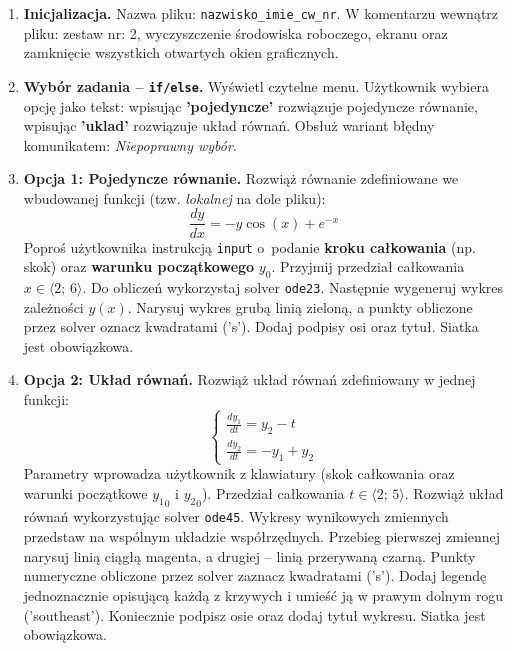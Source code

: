 \documentclass[a4paper,11pt]{article}
\begin{document}
\begin{enumerate}[leftmargin=*, label=\textbf{\arabic*.}, itemsep=2pt]

  \item \textbf{Inicjalizacja.}
    Nazwa pliku: \texttt{nazwisko\_imie\_cw\_nr}. W komentarzu wewnątrz pliku: zestaw nr: 2, wyczyszczenie środowiska roboczego, ekranu oraz zamknięcie wszystkich otwartych okien graficznych.

  \item \textbf{Wybór zadania -- \texttt{if/else}.}
    Wyświetl czytelne menu. Użytkownik wybiera opcję jako tekst: wpisując \textbf{'pojedyncze'} rozwiązuje pojedyncze równanie, wpisując \textbf{'uklad'} rozwiązuje układ równań. Obsłuż wariant błędny komunikatem: \textit{Niepoprawny wybór}.

  \item \textbf{Opcja 1: Pojedyncze równanie.}
    Rozwiąż równanie zdefiniowane we wbudowanej funkcji (tzw. \textit{lokalnej} na dole pliku):
    \[ \frac{dy}{dx} = -y\cos(x) + e^{-x} \]
    Poproś użytkownika instrukcją \texttt{input} o~podanie \textbf{kroku całkowania} (np. skok) oraz \textbf{warunku początkowego} $y_0$. Przyjmij przedział całkowania $x \in \langle 2;\,6 \rangle$.
    Do obliczeń wykorzystaj solver \texttt{ode23}. Następnie wygeneruj wykres zależności $y(x)$. Narysuj wykres grubą linią zieloną, a punkty obliczone przez solver oznacz kwadratami ('s'). Dodaj podpisy osi oraz tytuł. Siatka jest obowiązkowa.

  \item \textbf{Opcja 2: Układ równań.}
    Rozwiąż układ równań zdefiniowany w jednej funkcji:\\[-0.5em]
    \[
    \begin{cases}
      \frac{dy_1}{dt} = y_2 - t \\
      \frac{dy_2}{dt} = -y_1 + y_2
    \end{cases}
    \]
    Parametry wprowadza użytkownik z klawiatury (skok całkowania oraz warunki początkowe $ {y_1}_{0} $ i $ {y_2}_{0} $). Przedział całkowania $t \in \langle 2;\,5 \rangle$.
    Rozwiąż układ równań wykorzystując solver \texttt{ode45}. Wykresy wynikowych zmiennych przedstaw na wspólnym układzie współrzędnych. Przebieg pierwszej zmiennej narysuj linią ciągłą magenta, a drugiej -- linią przerywaną czarną. Punkty numeryczne obliczone przez solver zaznacz kwadratami ('s'). Dodaj legendę jednoznacznie opisującą każdą z krzywych i umieść ją w prawym dolnym rogu ('southeast'). Koniecznie podpisz osie oraz dodaj tytuł wykresu. Siatka jest obowiązkowa.

\end{enumerate}
\end{document}
